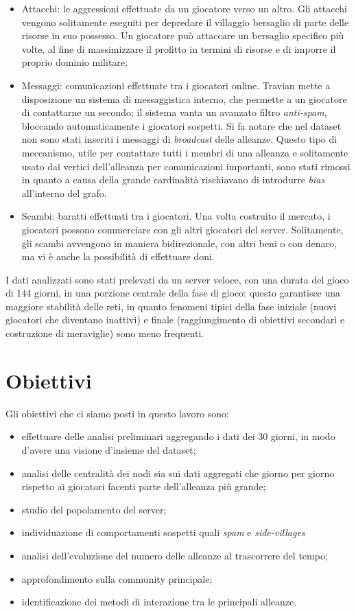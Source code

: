 \begin{itemize}
	\item Attacchi: le aggressioni effettuate da un giocatore verso un altro. Gli attacchi vengono solitamente eseguiti per depredare il villaggio bersaglio di parte delle risorse in suo possesso. Un giocatore può attaccare un bersaglio specifico più volte, al fine di massimizzare il profitto in termini di risorse e di imporre il proprio dominio militare;
	\item Messaggi: comunicazioni effettuate tra i giocatori online. Travian mette a disposizione un sistema di messaggistica interno, che permette a un giocatore di contattarne un secondo; il sistema vanta un avanzato filtro \textit{anti-spam}, bloccando automaticamente i giocatori sospetti.
	Si fa notare che nel dataset non sono stati inseriti i messaggi di \textit{broadcast} delle alleanze. Questo tipo di meccanismo, utile per contattare tutti i membri di una alleanza e solitamente usato dai vertici dell'alleanza per comunicazioni importanti, sono stati rimossi in quanto a causa della grande cardinalità rischiavano di introdurre \textit{bias} all'interno del grafo.
	\item Scambi: baratti effettuati tra i giocatori. Una volta costruito il mercato, i giocatori possono commerciare con gli altri giocatori del server. Solitamente, gli scambi avvengono in maniera bidirezionale, con altri beni o con denaro, ma vi è anche la possibilità di effettuare doni.
\end{itemize}
I dati analizzati sono stati prelevati da un server veloce, con una durata del gioco di 144 giorni, in una porzione centrale della fase di gioco: questo garantisce una maggiore stabilità delle reti, in quanto fenomeni tipici della fase iniziale (nuovi giocatori che diventano inattivi) e finale (raggiungimento di obiettivi secondari e costruzione di meraviglie) sono meno frequenti.

\section{Obiettivi}
Gli obiettivi che ci siamo posti in questo lavoro sono:
\begin{itemize}
	\item effettuare delle analisi preliminari aggregando i dati dei 30 giorni, in modo d'avere una visione d'insieme del dataset;
	\item analisi delle centralità dei nodi sia sui dati aggregati che giorno per giorno rispetto ai giocatori facenti parte dell'alleanza più grande;
	\item studio del popolamento del server;
	\item individuazione di comportamenti sospetti quali \textit{spam} e \textit{side-villages}
	\item analisi dell'evoluzione del numero delle alleanze al trascorrere del tempo;
	\item approfondimento sulla community principale;
	\item identificazione dei metodi di interazione tra le principali alleanze.
\end{itemize}